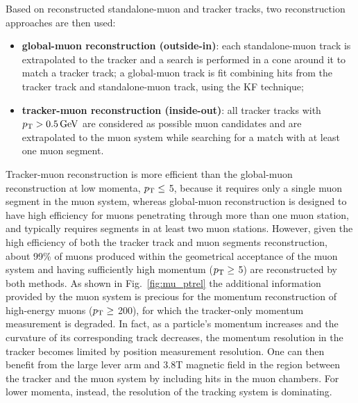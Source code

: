 Based on reconstructed standalone-muon and tracker tracks, two reconstruction approaches are then used:

\begin{itemize}
\item {\bf global-muon reconstruction (outside-in)}: each standalone-muon track is extrapolated to the tracker and a search is performed in a cone around it to match a tracker track; a global-muon track is fit combining hits from the tracker track and standalone-muon track, using the KF technique;
\item {\bf tracker-muon reconstruction (inside-out)}: all tracker tracks with $p_{\mathrm{T}} > 0.5\,\text{Ge\hspace{-.08em}V}$ are considered as possible muon candidates and are extrapolated to the muon system while searching for a match with at least one muon segment.
\end{itemize}

Tracker-muon reconstruction is more efficient than the global-muon reconstruction at low momenta, $p_{\mathrm{T}} \leq$ 5\GeV, because it requires only a single muon segment in the muon system, whereas global-muon reconstruction is designed to have high efficiency for muons penetrating through more than one muon station, and typically requires segments in at least two muon stations. However, given the high efficiency of both the tracker track and muon segments reconstruction, about 99\% of muons produced within the geometrical acceptance of the muon system and having sufficiently high momentum ($p_{\mathrm{T}} \geq$ 5\GeV) are reconstructed by both methods. As shown in Fig.~\ref{fig:mu_ptrel} the additional information provided by the muon system is precious for the momentum reconstruction of high-energy muons ($p_{\mathrm{T}} \geq$ 200\GeV), for which the tracker-only momentum measurement is degraded. 
In fact, as a particle's momentum increases and the curvature of its corresponding track decreases, the momentum resolution in the tracker becomes limited by position measurement resolution. One can then benefit from the large lever arm and 3.8\unit{T} magnetic field in the region between the tracker and the muon system by including hits in the muon chambers. For lower momenta, instead, the resolution of the tracking system is dominating.

